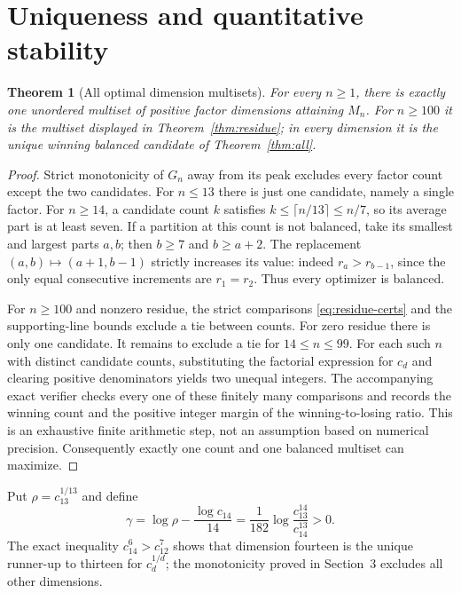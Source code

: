 \documentclass[11pt]{article}
\newtheorem{theorem}{Theorem}[section]
\theoremstyle{remark}\newtheorem{remark}[theorem]{Remark}
\begin{document}
\section{Uniqueness and quantitative stability}
\begin{theorem}[All optimal dimension multisets]\label{thm:unique}
For every $n\ge1$, there is exactly one unordered multiset of positive
factor dimensions attaining $M_n$. For $n\ge100$ it is the multiset
displayed in Theorem~\ref{thm:residue}; in every dimension it is the
unique winning balanced candidate of Theorem~\ref{thm:all}.
\end{theorem}
\begin{proof}
Strict monotonicity of $G_n$ away from its peak excludes every factor
count except the two candidates. For $n\le13$ there is just one
candidate, namely a single factor. For $n\ge14$, a candidate count $k$
satisfies $k\le\lceil n/13\rceil\le n/7$, so its average part is at
least seven. If a partition at this count is not balanced, take its
smallest and largest parts $a,b$; then $b\ge7$ and $b\ge a+2$.
The replacement $(a,b)\mapsto(a+1,b-1)$ strictly increases its value:
indeed $r_a>r_{b-1}$, since the only equal consecutive increments are
$r_1=r_2$. Thus every optimizer is balanced.

For $n\ge100$ and nonzero residue, the strict comparisons
\eqref{eq:residue-certs} and the supporting-line bounds exclude a tie
between counts. For zero residue there is only one candidate. It
remains to exclude a tie for $14\le n\le99$. For each such $n$ with
distinct candidate counts, substituting the factorial expression for
$c_d$ and clearing positive denominators yields two unequal integers.
The accompanying exact verifier checks every one of these finitely
many comparisons and records the winning count and the positive
integer margin of the winning-to-losing ratio. This is an exhaustive
finite arithmetic step, not an assumption based on numerical
precision. Consequently exactly one count and one balanced multiset
can maximize.
\end{proof}

Put $\rho=c_{13}^{1/13}$ and define
\[
 \gamma=\log\rho-\frac{\log c_{14}}{14}
 =\frac1{182}\log\frac{c_{13}^{14}}{c_{14}^{13}}>0.
\]
The exact inequality $c_{14}^{6}>c_{12}^{7}$ shows that dimension
fourteen is the unique runner-up to thirteen for $c_d^{1/d}$; the
monotonicity proved in Section~3 excludes all other dimensions.
\end{document}
